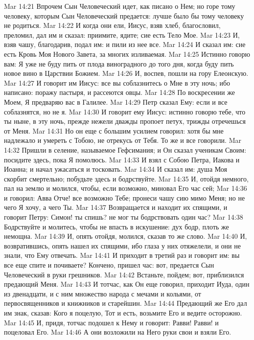 Mar 14:21  Впрочем Сын Человеческий идет, как писано о Нем; но горе тому человеку, которым Сын Человеческий предается: лучше было бы тому человеку не родиться.
Mar 14:22  И когда они ели, Иисус, взяв хлеб, благословил, преломил, дал им и сказал: приимите, ядите; сие есть Тело Мое.
Mar 14:23  И, взяв чашу, благодарив, подал им: и пили из нее все.
Mar 14:24  И сказал им: сие есть Кровь Моя Нового Завета, за многих изливаемая.
Mar 14:25  Истинно говорю вам: Я уже не буду пить от плода виноградного до того дня, когда буду пить новое вино в Царствии Божием.
Mar 14:26  И, воспев, пошли на гору Елеонскую.
Mar 14:27  И говорит им Иисус: все вы соблазнитесь о Мне в эту ночь; ибо написано: поражу пастыря, и рассеются овцы.
Mar 14:28  По воскресении же Моем, Я предваряю вас в Галилее.
Mar 14:29  Петр сказал Ему: если и все соблазнятся, но не я.
Mar 14:30  И говорит ему Иисус: истинно говорю тебе, что ты ныне, в эту ночь, прежде нежели дважды пропоет петух, трижды отречешься от Меня.
Mar 14:31  Но он еще с большим усилием говорил: хотя бы мне надлежало и умереть с Тобою, не отрекусь от Тебя. То же и все говорили.
Mar 14:32  Пришли в селение, называемое Гефсимания; и Он сказал ученикам Своим: посидите здесь, пока Я помолюсь.
Mar 14:33  И взял с Собою Петра, Иакова и Иоанна; и начал ужасаться и тосковать.
Mar 14:34  И сказал им: душа Моя скорбит смертельно; побудьте здесь и бодрствуйте.
Mar 14:35  И, отойдя немного, пал на землю и молился, чтобы, если возможно, миновал Его час сей;
Mar 14:36  и говорил: Авва Отче! все возможно Тебе; пронеси чашу сию мимо Меня; но не чего Я хочу, а чего Ты.
Mar 14:37  Возвращается и находит их спящими, и говорит Петру: Симон! ты спишь? не мог ты бодрствовать один час?
Mar 14:38  Бодрствуйте и молитесь, чтобы не впасть в искушение: дух бодр, плоть же немощна.
Mar 14:39  И, опять отойдя, молился, сказав то же слово.
Mar 14:40  И, возвратившись, опять нашел их спящими, ибо глаза у них отяжелели, и они не знали, что Ему отвечать.
Mar 14:41  И приходит в третий раз и говорит им: вы все еще спите и почиваете? Кончено, пришел час: вот, предается Сын Человеческий в руки грешников.
Mar 14:42  Встаньте, пойдем; вот, приблизился предающий Меня.
Mar 14:43  И тотчас, как Он еще говорил, приходит Иуда, один из двенадцати, и с ним множество народа с мечами и кольями, от первосвященников и книжников и старейшин.
Mar 14:44  Предающий же Его дал им знак, сказав: Кого я поцелую, Тот и есть, возьмите Его и ведите осторожно.
Mar 14:45  И, придя, тотчас подошел к Нему и говорит: Равви! Равви! и поцеловал Его.
Mar 14:46  А они возложили на Него руки свои и взяли Его.
